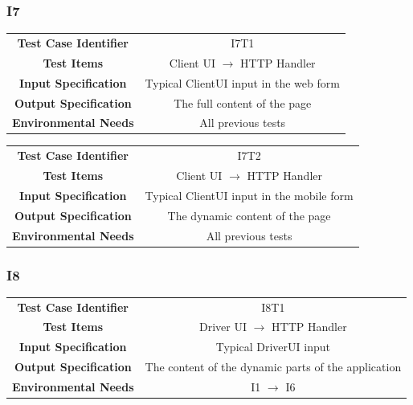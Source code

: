 \documentclass{article}
\begin{document}
\subsubsection{I7}
\begin{adjustbox}{width=1.2\textwidth}	
	\begin{tabular}{*{2}{c}}
		\midrule
		\textbf{Test Case Identifier} & I7T1\\
		\textbf{Test Items} & Client UI $\rightarrow$ HTTP Handler\\
		\textbf{Input Specification} & Typical ClientUI input in the web form\\
		\textbf{Output Specification} & The full content of the page\\ 
		\textbf{Environmental Needs} & All previous tests\\
		\bottomrule
	\end{tabular}
\end{adjustbox}
\begin{adjustbox}{width=1.2\textwidth}	
	\begin{tabular}{*{2}{c}}
		\midrule
		\textbf{Test Case Identifier} & I7T2\\
		\textbf{Test Items} & Client UI $\rightarrow$ HTTP Handler\\
		\textbf{Input Specification} & Typical ClientUI input in the mobile form\\
		\textbf{Output Specification} & The dynamic content of the page\\ 
		\textbf{Environmental Needs} & All previous tests\\
		\bottomrule
	\end{tabular}
\end{adjustbox}
\subsubsection{I8}
\begin{adjustbox}{width=1.2\textwidth}	
	\begin{tabular}{*{2}{c}}
		\midrule
		\textbf{Test Case Identifier} & I8T1\\
		\textbf{Test Items} & Driver UI $\rightarrow$ HTTP Handler\\
		\textbf{Input Specification} & Typical DriverUI input\\
		\textbf{Output Specification} & The content of the dynamic parts of the application\\
		\textbf{Environmental Needs} & I1 $\rightarrow$ I6\\
		\bottomrule
	\end{tabular}
\end{adjustbox}
\end{document}
